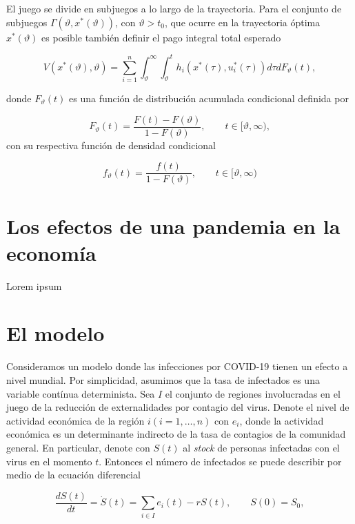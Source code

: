 \documentclass[11pt, oneside]{article}
\begin{document}
El juego se divide en subjuegos a lo largo de la trayectoria. Para el conjunto de subjuegos $\Gamma(\vartheta, x^*(\vartheta))$, con $\vartheta > t_0$, que ocurre en la trayectoria óptima $x^*(\vartheta)$ es posible también definir el pago integral total esperado 

\begin{equation}
	V(x^*(\vartheta), \vartheta) = \sum_{i=1}^n \int_{\vartheta}^\infty \int_{\vartheta}^t h_i(x^*(\tau), u_i^*(\tau))d\tau dF_\vartheta(t),
\end{equation}

donde $F_\vartheta(t)$ es una función de distribución acumulada condicional definida por

\begin{equation}
	F_\vartheta(t) = \frac{F(t) - F(\vartheta)}{1 - F(\vartheta)}, \qquad t \in [\vartheta, \infty),
\end{equation}
con su respectiva función de densidad condicional

\begin{equation}
	f_\vartheta(t) = \frac{f(t)}{1 - F(\vartheta)}, \qquad t \in [\vartheta, \infty)
\end{equation}


\section{Los efectos de una pandemia en la economía}

Lorem ipsum

\section{El modelo} 

Consideramos un modelo donde las infecciones por COVID-19 tienen un efecto a nivel mundial. Por simplicidad, asumimos que la tasa de infectados es una variable contínua determinista. Sea $I$ el conjunto de regiones involucradas en el juego de la reducción de externalidades por contagio del virus. Denote el nivel de actividad económica de la región $i (i = 1,\dots,n)$ con $e_i$, donde la actividad económica es un determinante indirecto de la tasa de contagios de la comunidad general. En particular, denote con $S(t)$ al \emph{stock} de personas infectadas con el virus en el momento $t$. Entonces el número de infectados se puede describir por medio de la ecuación diferencial 

\begin{equation}
	\frac{d S(t)}{dt} = \dot{S}(t) = \sum_{i \in I} e_i(t) - r S(t), \qquad S(0) = S_0,
\end{equation}
\end{document}
